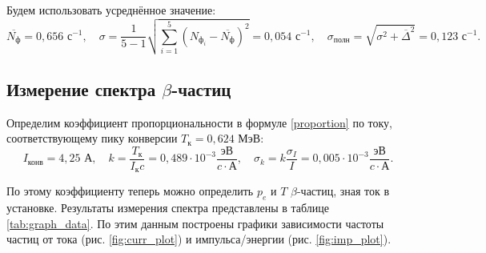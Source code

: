 \documentclass[a4paper,12pt]{article} %
\begin{document}
Будем использовать усреднённое значение:
\begin{equation*}
    \overline{N_\text{ф}} = 0,656 \text{ с}^{-1},\quad \sigma = \frac{1}{5 - 1}\sqrt{\sum\limits_{i=1}^5 (N_{\text{ф}_i} - \overline{N_\text{ф}})^2} = 0,054 \text{ с}^{-1},\quad \sigma_\text{полн} = \sqrt{\sigma^2 + \overline{\Delta}^2} = 0,123\text{ с}^{-1}.
\end{equation*}

\subsection{Измерение спектра $\beta$-частиц}
Определим коэффициент пропорциональности в формуле \eqref{proportion} по току, соответствующему пику конверсии $T_\text{к} = 0,624$ МэВ:
\[
    I_\text{конв} = 4,25\text{ А},\quad k = \frac{T_\text{к}}{I_\text{к}c} = 0,489\cdot 10^{-3} \frac{\text{эВ}}{c\cdot\text{А}},\quad \sigma_k = k\frac{\sigma_I}{I} = 0,005\cdot 10^{-3} \frac{\text{эВ}}{c\cdot\text{А}}.
\]

По этому коэффициенту теперь можно определить $p_e$ и $T$ $\beta$-частиц, зная ток в установке. Результаты измерения спектра представлены в таблице \ref{tab:graph_data}. По этим данным построены графики зависимости частоты частиц от тока (рис. \ref{fig:curr_plot}) и импульса/энергии (рис. \ref{fig:imp_plot}).
\end{document}
